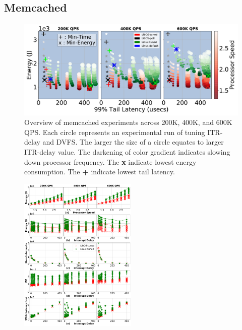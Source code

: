 \subsection{Memcached}
\label{sec:mcd}

\begin{figure}
\centering
\includegraphics[width=1\textwidth]{figures/mcd_overview}
\caption[]
{Overview of memcached experiments across 200K, 400K, and 600K QPS. Each circle represents an experimental run of tuning ITR-delay and DVFS. The larger the size of a circle equates to larger ITR-delay value. The darkening of color gradient indicates slowing down processor frequency. The \textbf{x} indicate lowest energy consumption. The \textbf{+} indicate lowest tail latency.}
\label{fig:mcd_overview}
\end{figure}
\begin{figure}
\includegraphics[width=0.5\textwidth]{figures/mcd_detail_1}
\caption[]{}
\label{fig:mcd_detail_1}
\end{figure}
